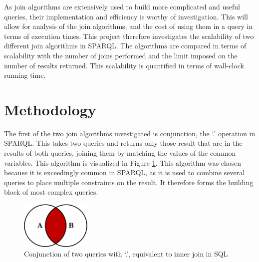 \documentclass[10pt,a4paper]{article}
\begin{document}
	As join algorithms are extensively used to build more complicated and useful queries, their implementation and efficiency is worthy of investigation. This will allow for analysis of the join algorithms, and the cost of using them in a query in terms of execution times. This project therefore investigates the scalability of two different join algorithms in SPARQL. The algorithms are compared in terms of scalability with the number of joins performed and the limit imposed on the number of results returned. This scalability is quantified in terms of wall-clock running time.
	
	
	\section*{Methodology}
	
	The first of the two join algorithms investigated is conjunction, the `.' operation in SPARQL. This takes two queries and returns only those result that are in the results of both queries, joining them by matching the values of the common variables. This algorithm is visualized in Figure \ref{inner_join}. This algorithm was chosen because it is exceedingly common in SPARQL, as it is used to combine several queries to place multiple constraints on the result. It therefore forms the building block of most complex queries.
		
	\begin{figure}
		\vspace{-1em}
		\centering
		\includegraphics[width=0.3\textwidth]{figures/inner_join}
		\caption{Conjunction of two queries with `.', equivalent to inner join in SQL \cite{Moffatt}}
		\label{inner_join}
		\vspace{-1em}
	\end{figure}
\end{document}
